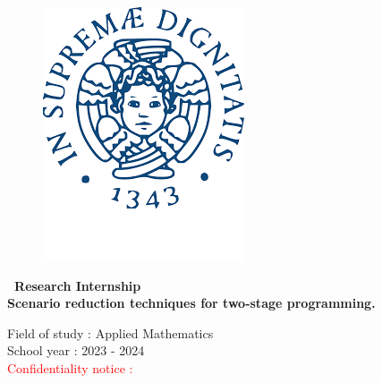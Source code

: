 \documentclass{amsart}
\begin{document}
\begin{figure}[htbp]
\begin{minipage}[b]{0.25\textwidth}
        \includegraphics[width=\textwidth]{logo/universita di pisa.png}
    \end{minipage}
\end{figure}

\vspace{1.5cm}	

\begin{center}	
    {\huge \bf\ Research Internship  \\
    \vspace{1cm}
    \huge Scenario reduction techniques for two-stage programming. \\
    \vspace{1.5cm}

    \normalsize Field of study : Applied Mathematics \\
    School year : 2023 - 2024 \\



    \vspace{3.3cm}
    \textcolor{red}{Confidentiality notice : }\\
    \color{black}
    \vspace{0.5cm}
    }
\end{center}
\end{document}
